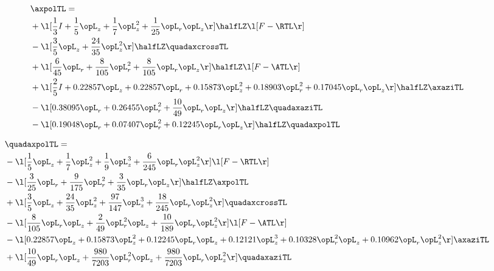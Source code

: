 \begin{alignat}{2} 
\label{eq:linaxpolTL_1} 
& \axpolTL = \\ 
& + \l[ \frac{1}{3} I + \frac{1}{5} \opL_z + \frac{1}{7} \opL_z^{2} + \frac{1}{25} \opL_r \opL_z  \r] \halfLZ \l[ F - \RTL \r] \nonumber \\ 
& - \l[ \frac{3}{5} \opL_z + \frac{24}{35} \opL_z^{2}  \r] \halfLZ \quadaxcrossTL \nonumber \\ 
& + \l[ \frac{6}{45} \opL_r + \frac{8}{105} \opL_r^{2} + \frac{8}{105} \opL_r \opL_z  \r] \halfLZ \l[ F - \ATL \r] \nonumber \\ 
& + \l[ \frac{2}{5} I +  0.22857 \opL_z +  0.22857 \opL_r +  0.15873 \opL_z^{2} +  0.18903 \opL_r^{2} +  0.17045 \opL_r \opL_z  \r] \halfLZ \axaziTL \nonumber \\ 
& - \l[  0.38095 \opL_r +  0.26455 \opL_r^{2} + \frac{10}{49} \opL_r \opL_z  \r] \halfLZ \quadaxaziTL \nonumber \\ 
& - \l[  0.19048 \opL_r +  0.07407 \opL_r^{2} +  0.12245 \opL_r \opL_z  \r] \halfLZ \quadaxpolTL \nonumber \\ 
\end{alignat} 


\begin{alignat}{2} 
\label{eq:quadaxpolTL_1} 
& \quadaxpolTL = \\ 
& - \l[ \frac{1}{5} \opL_z + \frac{1}{7} \opL_z^{2} + \frac{1}{9} \opL_z^{3} + \frac{6}{245} \opL_r \opL_z^{2}  \r] \l[ F - \RTL \r] \nonumber \\ 
& - \l[ \frac{3}{25} \opL_r + \frac{9}{175} \opL_r^{2} + \frac{3}{35} \opL_r \opL_z  \r] \halfLZ \axpolTL \nonumber \\ 
& + \l[ \frac{3}{5} \opL_z + \frac{24}{35} \opL_z^{2} + \frac{97}{147} \opL_z^{3} + \frac{18}{245} \opL_r \opL_z^{2}  \r] \quadaxcrossTL \nonumber \\ 
& - \l[ \frac{8}{105} \opL_r \opL_z + \frac{2}{49} \opL_r^{2} \opL_z + \frac{10}{189} \opL_r \opL_z^{2}  \r] \l[ F - \ATL \r] \nonumber \\ 
& - \l[  0.22857 \opL_z +  0.15873 \opL_z^{2} +  0.12245 \opL_r \opL_z +  0.12121 \opL_z^{3} +  0.10328 \opL_r^{2} \opL_z +  0.10962 \opL_r \opL_z^{2}  \r] \axaziTL \nonumber \\ 
& + \l[ \frac{10}{49} \opL_r \opL_z + \frac{980}{7203} \opL_r^{2} \opL_z + \frac{980}{7203} \opL_r \opL_z^{2}  \r] \quadaxaziTL \nonumber \\ 
\end{alignat} 


